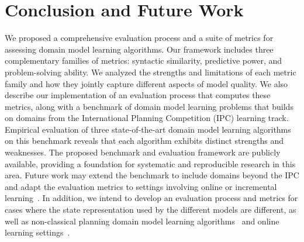 \documentclass[letterpaper]{article} %
\newcommand{\miniparagraph}[1]{\textbf{#1.}}
\newcommand{\commentout}[1]{ }
\newif\ifaddcomments
\newcommand{\brendan}[1]{\ifaddcomments{\textcolor{brown}{[Brendan: {#1}]}}\fi}
\begin{document}
\section{Conclusion and Future Work}
We proposed a comprehensive evaluation process and a suite of metrics for assessing domain model learning algorithms. Our framework includes three complementary families of metrics: syntactic similarity, predictive power, and problem-solving ability. We analyzed the strengths and limitations of each metric family and how they jointly capture different aspects of model quality.
We also describe our implementation of an evaluation process that computes these metrics, along with a benchmark of domain model learning problems that builds on domains from the International Planning Competition (IPC) learning track.
Empirical evaluation of three state-of-the-art domain model learning algorithms on this benchmark reveals that each algorithm exhibits distinct strengths and weaknesses.
The proposed benchmark and evaluation framework are publicly available, providing a foundation for systematic and reproducible research in this area.
Future work may extend the benchmark to include domains beyond the IPC and adapt the evaluation metrics to settings involving online or incremental learning~\citep{lamanna2021online, sreedharan2023optimistic, benyamin2025integratingreinforcementlearningaction, ng2019incremental, chitnis2021glib, jin2022creativity, verma2023autonomous, karia2023epistemic}. 
In addition, we intend to develop an evaluation process and metrics for cases where the state representation used by the different models are different, as well as non-classical planning domain model learning algorithms~\cite{mordoch2023learning} and online learning settings~\cite{lamanna2021online}.


\commentout{
\miniparagraph{Online learning of domain models}
Here, the learning algorithm is required to learn a domain model by actively interacting with the environment~\citep{lamanna2021online, sreedharan2023optimistic, benyamin2025integratingreinforcementlearningaction, ng2019incremental, chitnis2021glib, jin2022creativity, verma2023autonomous, karia2023epistemic}. 
All the proposed metrics can be computed as-is, after a predefined number of iterations, for the online learning setting. 
However, an additional perspective that may be of interest in online learning of domain models is \emph{cumulative} metrics of the learning process, such as the number of actions performed for learning or the number of problems failed to solve while collecting observations.
Specific metrics and evaluation for online learning of domain models, however, are beyond the scope of this work. 
}
\end{document}
